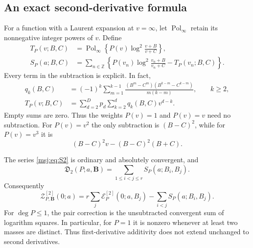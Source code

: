 \subsection{An exact second-derivative formula}

For a function with a Laurent expansion at $v=\infty$, let
$\operatorname{Pol}_{\infty}$ retain its nonnegative integer powers of
$v$. Define
\begin{align}
 T_P(v;B,C)
 &=\operatorname{Pol}_{\infty}
       \left\{P(v)\log^2\frac{v+B}{v+C}\right\},
 \label{msj:eq:T2}\\
 S_P(a;B,C)
 &=\sum_{n\in\mathbb Z}
 \left\{P(v_n)\log^2\frac{v_n+B}{v_n+C}-T_P(v_n;B,C)\right\}.
 \label{msj:eq:S2}
\end{align}
Every term in the subtraction is explicit. In fact,
\begin{align}
 q_k(B,C)&=(-1)^k\sum_{m=1}^{k-1}
 \frac{(B^m-C^m)(B^{k-m}-C^{k-m})}{m(k-m)},\qquad k\ge2,
 \label{msj:eq:qcoeff}\\
 T_P(v;B,C)&=\sum_{d=2}^{D}p_d\sum_{k=2}^{d}q_k(B,C)v^{d-k}.
 \label{msj:eq:T2-explicit}
\end{align}
Empty sums are zero. Thus the weights $P(v)=1$ and $P(v)=v$ need no
subtraction. For $P(v)=v^2$ the only subtraction is $(B-C)^2$, while
for $P(v)=v^3$ it is
\[
 (B-C)^2v-(B-C)^2(B+C).
\]

\begin{theorem}
\label{msj:thm:second}
The series \eqref{msj:eq:S2} is ordinary and absolutely convergent, and
\begin{equation}
 \boxed{\displaystyle
 \mathfrak D_2(P;a,\boldsymbol B)
     =\sum_{1\le i<j\le r}S_P(a;B_i,B_j).}
 \label{msj:eq:second-pairwise}
\end{equation}
Consequently
\begin{equation}
 \mathcal Z_{P,\boldsymbol B}^{[2]}(0;a)
 =r\sum_j\mathcal E_P^{[2]}(0;a,B_j)
                       -\sum_{i<j}S_P(a;B_i,B_j).
 \label{msj:eq:second-evaluation}
\end{equation}
For $\deg P\le1$, the pair correction is the unsubtracted convergent
sum of logarithm squares. In particular, for $P=1$ it is nonzero whenever
at least two masses are distinct. Thus first-derivative additivity does
not extend unchanged to second derivatives.
\end{theorem}

